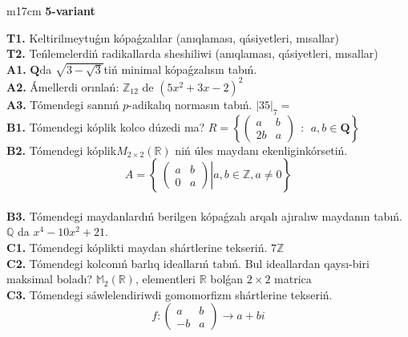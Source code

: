 \documentclass{article}
\begin{document}
\begin{tabular}{m{17cm}}
\textbf{5-variant}
\newline

\textbf{T1.} Keltirilmeytuǵın kópaǵzalılar (anıqlaması, qásiyetleri, mısallar) \\
\textbf{T2.} Teńlemelerdiń radikallarda sheshiliwi (anıqlaması, qásiyetleri, mısallar) \\
\textbf{A1.} \(\mathbf{Q}\)da \(\sqrt{3 - \sqrt{3}}\)tiń minimal kópaǵzalısın tabıń. \\
\textbf{A2.} Ámellerdi orınlań: \(\mathbb{Z}_{12}\) de \(\left( 5x^{2} + 3x - 2 \right)^{2}\) \\
\textbf{A3.} Tómendegi sannıń \(p\)-adikalıq normasın tabıń. \(|35|_{7} =\) \\
\textbf{B1.} Tómendegi kóplik kolco dúzedi ma? \(R = \left\{ \begin{pmatrix}
a & b \\
2b & a
\end{pmatrix}\ \ :\ \ a,b \in \mathbf{Q} \right\}\) \\
\textbf{B2.} Tómendegi kóplik\(M_{2 \times 2}\left( \mathbb{R} \right)\) niń úles maydanı ekenliginkórsetiń.
\[A = \left\{ \left. \ \begin{pmatrix}
a & b \\
0 & a
\end{pmatrix} \right|a,b\mathbb{\in Z},a \neq 0 \right\}\] \\
\textbf{B3.} Tómendegi maydanlardıń berilgen kópaǵzalı arqalı ajıralıw maydanın tabıń. \(\mathbb{Q}\) da \(x^{4} - 10x^{2} + 21\). \\
\textbf{C1.} Tómendegi kóplikti maydan shártlerine tekseriń. \(7\mathbb{Z}\) \\
\textbf{C2.} Tómendegi kolconıń barlıq ideallarıń tabıń. Bul ideallardan qaysı-biri maksimal boladı? \(\mathbb{M}_{2}\left( \mathbb{R} \right)\), elementleri \(\mathbb{R}\) bolǵan \(2 \times 2\) matrica \\
\textbf{C3.} Tómendegi sáwlelendiriwdi gomomorfizm shártlerine tekseriń.
\[f:\begin{pmatrix}
a & b \\
 - b & a
\end{pmatrix} \rightarrow a + bi\] \\

\end{tabular}
\vspace{1cm}
\end{document}
